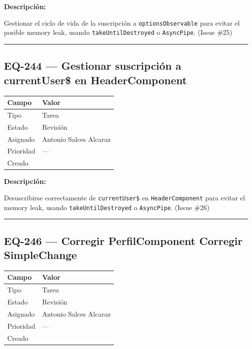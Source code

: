 \documentclass[
  spanish,
  11pt,
]{report}
\newcounter{none} %
\begin{document}
\textbf{Descripción:}

Gestionar el ciclo de vida de la suscripción a
\texttt{optionsObservable} para evitar el posible memory leak, usando
\texttt{takeUntilDestroyed} o \texttt{AsyncPipe}. (Issue \#25)

\begin{center}\rule{0.5\linewidth}{0.5pt}\end{center}

\subsection{EQ-244 --- Gestionar suscripción a currentUser\$ en
HeaderComponent}\label{eq-244-gestionar-suscripciuxf3n-a-currentuser-en-headercomponent}

{\def\LTcaptype{none} %
\begin{longtable}[]{@{}ll@{}}
\toprule\noalign{}
Campo & Valor \\
\midrule\noalign{}
\endhead
\bottomrule\noalign{}
\endlastfoot
Tipo & Tarea \\
Estado & Revisión \\
Asignado & Antonio Salces Alcaraz \\
Prioridad & --- \\
Creado & \\
\end{longtable}
}

\textbf{Descripción:}

Desuscribirse correctamente de \texttt{currentUser\$} en
\texttt{HeaderComponent} para evitar el memory leak, usando
\texttt{takeUntilDestroyed} o \texttt{AsyncPipe}. (Issue \#26)

\begin{center}\rule{0.5\linewidth}{0.5pt}\end{center}

\subsection{EQ-246 --- Corregir PerfilComponent Corregir
SimpleChange}\label{eq-246-corregir-perfilcomponent-corregir-simplechange}

{\def\LTcaptype{none} %
\begin{longtable}[]{@{}ll@{}}
\toprule\noalign{}
Campo & Valor \\
\midrule\noalign{}
\endhead
\bottomrule\noalign{}
\endlastfoot
Tipo & Tarea \\
Estado & Revisión \\
Asignado & Antonio Salces Alcaraz \\
Prioridad & --- \\
Creado & \\
\end{longtable}
}
\end{document}

